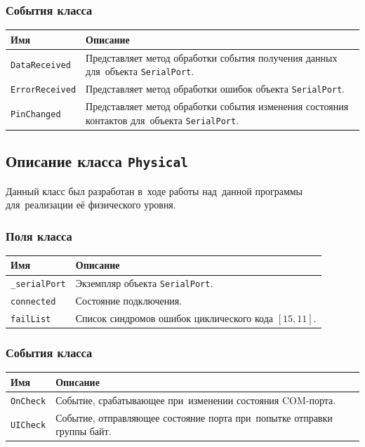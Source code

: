 \documentclass[a4paper,12pt]{article}
\begin{document}
\subsubsection*{События класса}
\begin{center}
\begin{longtabu} to \linewidth {|X|X[2.6]|}
\hline
\textbf{Имя}	&	\textbf{Описание}\\\hline\endhead
\texttt{DataReceived}	&	Представляет метод обработки события получения данных для~объекта \texttt{SerialPort}.\\\hline
\texttt{ErrorReceived}	&	Представляет метод обработки ошибок объекта \texttt{SerialPort}.\\\hline
\texttt{PinChanged}	&	Представляет метод обработки события изменения состояния контактов для~объекта \texttt{SerialPort}.\\\hline
\end{longtabu}
\end{center}

\subsection{Описание класса \texttt{Physical}}
Данный класс был разработан в~ходе работы над~данной программы для~реализации её физического уровня.

\subsubsection*{Поля класса}
\begin{center}
\begin{longtabu} to \linewidth {|X|X[2.6]|}
\hline
\textbf{Имя}	&	\textbf{Описание}\\\hline\endhead
\texttt{\_serialPort}	&	Экземпляр объекта \texttt{SerialPort}.\\\hline
\texttt{connected}	&	Состояние подключения.\\\hline
\texttt{failList}	&	Список синдромов ошибок циклического кода $[15,11]$.\\\hline
\end{longtabu}
\end{center}

\subsubsection*{События класса}
\begin{center}
\begin{longtabu} to \linewidth {|X|X[2.6]|}
\hline
\textbf{Имя}	&	\textbf{Описание}\\\hline\endhead
\texttt{OnCheck}	&	Событие, срабатывающее при~изменении состояния COM-порта.\\\hline
\texttt{UICheck}	&	Событие, отправляющее состояние порта при~попытке отправки группы байт.\\\hline
\end{longtabu}
\end{center}
\end{document}
